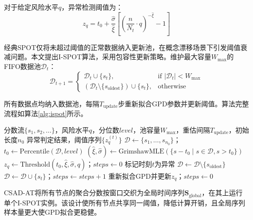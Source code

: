 \documentclass[10.5pt,a4paper,twocolumn]{ctexart}
\begin{document}
对于给定风险水平$q$，异常检测阈值为：
\begin{equation}\label{eq:spot_threshold}
    z_q = t_0 + \frac{\hat{\sigma}}{\hat{\xi}}\left[\left(\frac{n}{N_t} \cdot q\right)^{-\hat{\xi}} - 1\right]
\end{equation}

经典SPOT仅将未超过阈值的正常数据纳入更新池，在概念漂移场景下引发阈值衰减问题。本文提出I-SPOT算法，采用包容性更新策略。维护最大容量$W_{\max}$的FIFO数据池$\mathcal{D}_t$：
\begin{equation}
    \mathcal{D}_{t+1} = \begin{cases}
        \mathcal{D}_t \cup \{s_t\}, & \text{if } |\mathcal{D}_t| < W_{\max} \\
        (\mathcal{D}_t \setminus \{s_{\text{oldest}}\}) \cup \{s_t\}, & \text{otherwise}
    \end{cases}
\end{equation}

所有数据点均纳入数据池，每隔$T_{\text{update}}$步重新拟合GPD参数并更新阈值。算法完整流程如算法\ref{alg:ispot}所示。

\begin{algorithm}[htbp]
\caption{I-SPOT自适应阈值算法}
\label{alg:ispot}
\begin{algorithmic}[1]
\REQUIRE 分数流$\{s_1, s_2, \ldots\}$，风险水平$q$，分位数$\textit{level}$，池容量$W_{\max}$，重估间隔$T_{\text{update}}$，初始长度$n_0$
\ENSURE 异常判定结果，阈值序列$\{z_q^{(t)}\}$
\STATE $\mathcal{D} \gets \{s_1, \ldots, s_{n_0}\}$；$t_0 \gets \text{Percentile}(\mathcal{D}, \textit{level})$
\STATE $(\hat{\xi}, \hat{\sigma}) \gets \text{GrimshawMLE}(\{s\!-\!t_0 \mid s \in \mathcal{D}, s > t_0\})$
\STATE $z_q \gets \text{Threshold}(t_0, \hat{\xi}, \hat{\sigma}, q)$；$\textit{steps} \gets 0$
        \STATE 标记时刻$t$为异常
    \ENDIF
        \STATE $\mathcal{D} \gets \mathcal{D} \setminus \{s_{\text{oldest}}\}$
    \ENDIF
    \STATE $\mathcal{D} \gets \mathcal{D} \cup \{s_t\}$；$\textit{steps} \gets \textit{steps} + 1$
        \STATE 重新拟合GPD并更新$z_q$；$\textit{steps} \gets 0$
    \ENDIF
\ENDFOR
\end{algorithmic}
\end{algorithm}

CSAD-AT将所有节点的聚合分数按窗口交织为全局时间序列$\mathbf{S}_{\text{global}}$，在其上运行单个I-SPOT实例。该设计使所有节点共享同一阈值，降低计算开销，且全局序列样本量更大使GPD拟合更稳健。
\end{document}
